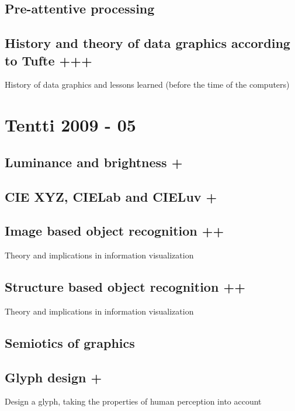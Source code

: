 \documentclass[a4paper]{article}
\begin{document}
\subsection{Pre-attentive processing}

\subsection{History and theory of data graphics according to Tufte +++}

History of data graphics and lessons learned (before the time of the computers)

\section{Tentti 2009 - 05}

\subsection{Luminance and brightness +}

\subsection{CIE XYZ, CIELab and CIELuv +}

\subsection{Image based object recognition ++}

Theory and implications in information visualization

\subsection{Structure based object recognition ++}

Theory and implications in information visualization

\subsection{Semiotics of graphics}

\subsection{Glyph design +}

Design a glyph, taking the properties of human perception into account
\end{document}

